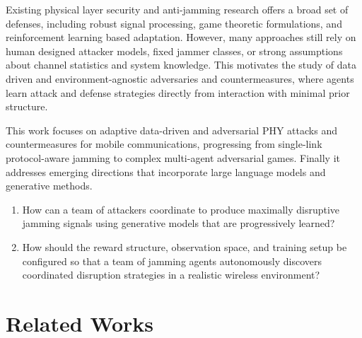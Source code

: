 \documentclass[conference]{IEEEtran}
\newcommand{\adm}[1]{{\color{orange}{[#1]}}}
\begin{document}
Existing physical layer security and anti-jamming research offers a broad set of defenses, including robust signal processing, game theoretic formulations, and reinforcement learning based adaptation. However, many approaches still rely on human designed attacker models, fixed jammer classes, or strong assumptions about channel statistics and system knowledge. 
This motivates the study of data driven and environment-agnostic adversaries and countermeasures, where agents learn attack and defense strategies directly from interaction with minimal prior structure.

This work focuses on adaptive data-driven and adversarial PHY attacks and countermeasures for mobile communications, progressing from single-link protocol-aware jamming to complex multi-agent adversarial games.
Finally it addresses emerging directions that incorporate large language models and generative methods.

\begin{enumerate}
    \item How can a team of attackers coordinate to produce maximally disruptive jamming signals using generative models that are progressively learned?
    \item How should the reward structure, observation space, and training setup be configured so that a team of jamming agents autonomously discovers coordinated disruption strategies in a realistic wireless environment?
\end{enumerate}

\section{Related Works}
\end{document}

